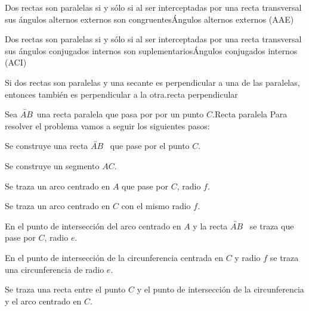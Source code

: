 \begin{conjetura}{Dos rectas son  paralelas si y s\'olo si  al ser
interceptadas por una recta transversal sus \'angulos alternos externos
son congruentes}{\'Angulos
alternos externos (AAE)}
 \end{conjetura}

\begin{conjetura}{Dos rectas son  paralelas si y s\'olo si  al ser
interceptadas por una recta transversal sus \'angulos conjugados
internos son suplementarios}{\'Angulos
conjugados internos (ACI)}
 \end{conjetura}
\begin{teorema}{Si dos rectas son paralelas y una secante es perpendicular a una
de las paralelas, entonces tambi\'en es perpendicular a la otra.}{recta
perpendicular}
\end{teorema}
\begin{construccion}{Sea $\overleftrightarrow{AB}$\ una recta paralela
que pasa por por un punto $C$.}{Recta paralela}
Para resolver el problema vamos a seguir los siguientes pasos:
\begin{lista}
 \item Se construye una recta $\overleftrightarrow{AB}$ \ que pase por el punto
$C$.
\item Se construye un segmento $AC$.
\item Se traza un arco centrado en $A$ que pase por $C$, radio $f$.
\item Se traza un arco centrado en $C$ con el mismo radio $f$.
\item En el punto de intersecci\'on del arco centrado en $A$ y la recta
$\overleftrightarrow{AB}$  \ se traza que pase por $C$, radio $e$.
\item En el punto de intersecci\'on de la circunferencia centrada en $C$ y
radio $f$ se traza una circunferencia de radio $e$.
\item Se traza una recta entre el punto $C$ y el punto de intersecci\'on de la
circunferencia y el arco centrado en $C$.
\end{lista}

\end{construccion}
